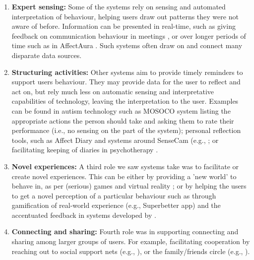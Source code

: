 \documentclass[prodmode,acmtochi]{acmsmall}
\newcommand{\todo}[1]{\textrm{\textrm{\textcolor{LightBlue}{[[#1]]}}}}
\newcommand{\GeraldineDIS}[1]{}
\newcommand{\rephrase}[1]{\textrm{\textrm{\textcolor{gray}{#1}}}}
\begin{document}
        \begin{enumerate}
                \item {\bf Expert sensing:} Some of the systems rely on sensing and automated interpretation of behaviour, helping users draw out patterns they were not aware of before. Information can be presented in real-time, such as giving feedback on communication behaviour in meetings \cite{Kim2008,DiMicco2007}, or over longer periods of time such as in AffectAura \cite{McDuff2012}. Such systems often draw on and connect many disparate data sources. 
                


                \item {\bf Structuring activities:} Other systems aim to provide timely reminders to support users behaviour. They may provide data for the user to reflect and act on, but rely much less on automatic sensing and interpretative capabilities of technology, leaving the interpretation to the user. Examples can be found in autism technology such as MOSOCO system \cite{Escobedo2012} listing the appropriate actions the person should take and asking them to rate their performance (i.e., no sensing on the part of the system); personal reflection tools, such as Affect Diary \cite{Stahl2008} and systems around SenseCam (e.g., \cite{Fleck2009}; or facilitating keeping of diaries in psychotherapy \cite{Matthews2011}.  

                \item {\bf Novel experiences:} A third role we saw systems take was to facilitate or create novel experiences. This can be either by providing a 'new world' to behave in,  as per (serious) games \cite{Hailpern2011} and virtual reality \cite{Bouchard2012,Romano2005};  or by helping the users to get a novel perception of a particular behaviour such as through gamification of real-world experience (e.g., Superbetter app) and  the accentuated feedback in systems developed by . 

                \item {\bf Connecting and sharing:} Fourth role was in supporting connecting and sharing among larger groups of users. For example, facilitating cooperation by reaching out to social support nets (e.g., \cite{Newman2011}), or the family/friends circle (e.g., \cite{Hong2012,Munson2010}).


\GeraldineDIS{G: need to include displays/modalities or whatever here too?   P: It doesn't seem to fit for me here, but perhaps I just misunderstood. The rest of the section talks about {\bf what} the technology does (conceptually), while modalities/displays are rather about specific {\bf hows} to do thigs like this. As such, they then got grouped into the design challenges.}        
\end{enumerate}
\end{document}
